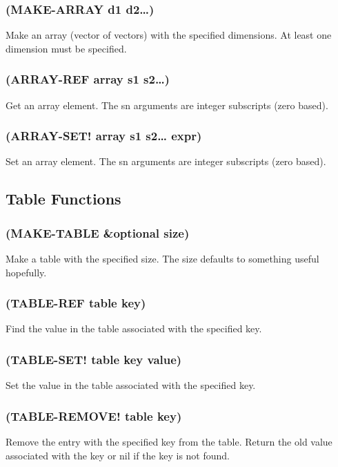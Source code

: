 \documentclass[11pt]{article}
\begin{document}
\subsubsection{(MAKE-ARRAY d1 d2\ldots{})}
\label{sec-4-19-1}

Make an array (vector of vectors) with the specified dimensions.  At
least one dimension must be specified.
\subsubsection{(ARRAY-REF array s1 s2\ldots{})}
\label{sec-4-19-2}

Get an array element.  The sn arguments are integer subscripts (zero
based).
\subsubsection{(ARRAY-SET! array s1 s2\ldots{} expr)}
\label{sec-4-19-3}

Set an array element.  The sn arguments are integer subscripts (zero
based).
\subsection{Table Functions}
\label{sec-4-20}

\subsubsection{(MAKE-TABLE \&optional size)}
\label{sec-4-20-1}

Make a table with the specified size.  The size defaults to something
useful hopefully.
\subsubsection{(TABLE-REF table key)}
\label{sec-4-20-2}

Find the value in the table associated with the specified key.
\subsubsection{(TABLE-SET! table key value)}
\label{sec-4-20-3}

Set the value in the table associated with the specified key.
\subsubsection{(TABLE-REMOVE! table key)}
\label{sec-4-20-4}

Remove the entry with the specified key from the table.  Return the
old value associated with the key or nil if the key is not found.
\end{document}

